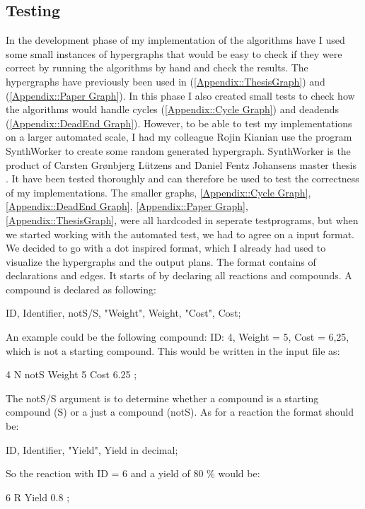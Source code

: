 \documentclass[a4paper,10pt,titlepage]{paper}
\begin{document}
\subsection{Testing}
\label{sec::testing}
In the development phase of my implementation of the algorithms have I used some small instances of hypergraphs that would be easy to check if they were correct by running the algorithms by hand and check the results. The hypergraphs have previously been used in \cite{Carsten} (\ref{Appendix::ThesisGraph}) and \cite{Fagerberg} (\ref{Appendix::Paper Graph}). In this phase I also created small tests to check how the algorithms would handle cycles (\ref{Appendix::Cycle Graph}) and deadends (\ref{Appendix::DeadEnd Graph}).
However, to be able to test my implementations on a larger automated scale, I had my colleague Rojin Kianian use the program SynthWorker to create some random generated hypergraph. SynthWorker is the product of Carsten Grønbjerg Lützens and Daniel Fentz Johansens master thesis \cite{Carsten}. It have been tested thoroughly and can therefore be used to test the correctness of my implementations.
The smaller graphs, \ref{Appendix::Cycle Graph},\ref{Appendix::DeadEnd Graph}, \ref{Appendix::Paper Graph}, \ref{Appendix::ThesisGraph}, were all hardcoded in seperate testprograms, but when we started working with the automated test, we had to agree on a input format. We decided to go with a dot inspired format, which I already had used to visualize the hypergraphs and the output plans. The format contains of declarations and edges. It starts of by declaring all reactions and compounds. A compound is declared as following:
\begin{center}
ID, Identifier, notS/S, "Weight", Weight, "Cost", Cost;
\end{center}
An example could be the following compound: ID: 4, Weight = 5, Cost = 6,25, which is not a starting compound. This would be written in the input file as:
\begin{center}
4 N notS Weight 5 Cost 6.25 ;
\end{center}
The notS/S argument is to determine whether a compound is a starting compound (S) or a just a compound (notS).
As for a reaction the format should be:
\begin{center}
ID, Identifier, "Yield", Yield in decimal;
\end{center}
So the reaction with ID = 6 and a yield of 80 \% would be:
\begin{center}
6 R Yield 0.8 ;
\end{center}
\end{document}
